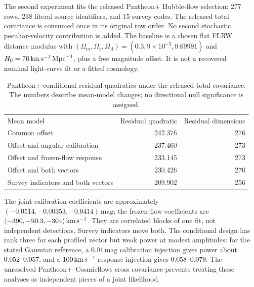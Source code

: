 The second experiment fits the released Pantheon+ Hubble-flow selection: 277 rows, 238 literal source identifiers, and 15 survey codes. The released total covariance is consumed once in its original row order. No second stochastic peculiar-velocity contribution is added. The baseline is a chosen flat FLRW distance modulus with $(\Omega_m,\Omega_r,\Omega_\Lambda)=(0.3,9\times10^{-5},0.69991)$ and $H_0=70\,\mathrm{km}\,\mathrm{s}^{-1}\,\mathrm{Mpc}^{-1}$, plus a free magnitude offset. It is not a recovered nominal light-curve fit or a fitted cosmology.

\begin{table}[ht]
\caption{Pantheon+ conditional residual quadratics under the released total covariance. The numbers describe mean-model changes; no directional null significance is assigned.}
\label{tab:sn}
\begin{ruledtabular}\begin{tabular}{lrr}
Mean model&Residual quadratic&Residual dimensions\\
Common offset&242.376&276\\
Offset and angular calibration&237.460&273\\
Offset and frozen-flow response&233.145&273\\
Offset and both vectors&230.426&270\\
Survey indicators and both vectors&209.902&256
\end{tabular}\end{ruledtabular}
\end{table}

The joint calibration coefficients are approximately $(-0.0514,-0.00353,-0.0414)\,\mathrm{mag}$; the frozen-flow coefficients are $(-390,-90.3,-304)\,\mathrm{km}\,\mathrm{s}^{-1}$. They are correlated blocks of one fit, not independent detections. Survey indicators move both. The conditional design has rank three for each profiled vector but weak power at modest amplitudes: for the stated Gaussian reference, a $0.01\,\mathrm{mag}$ calibration injection gives power about $0.052$--$0.057$, and a $100\,\mathrm{km}\,\mathrm{s}^{-1}$ response injection gives $0.058$--$0.079$. The unresolved Pantheon+--Cosmicflows cross covariance prevents treating these analyses as independent pieces of a joint likelihood.
